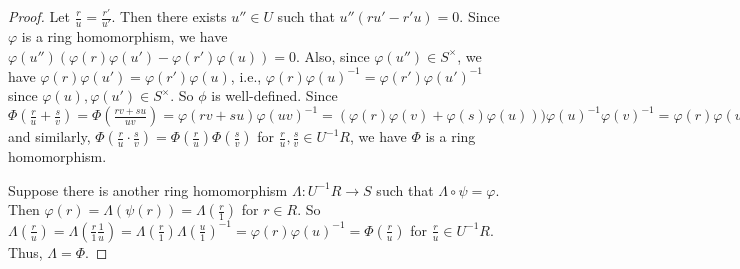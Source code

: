 \begin{proof}
    Let $\frac{r}{u} = \frac{r'}{u'}$. Then there exists $u'' \in U$ such that $u''(ru'-r'u) = 0$. Since $\varphi$ is a ring homomorphism, we have $\varphi(u'')(\varphi(r)\varphi(u') - \varphi(r')\varphi(u)) = 0$. Also, since $\varphi(u'') \in S^{\times}$, we have $\varphi(r)\varphi(u') = \varphi(r')\varphi(u)$, i.e., $\varphi(r)\varphi(u)^{-1} = \varphi(r')\varphi(u')^{-1}$ since $\varphi(u), \varphi(u') \in S^{\times}$. So $\phi$ is well-defined. Since $\Phi(\frac{r}{u} + \frac{s}{v}) = \Phi(\frac{rv+su}{uv}) = \varphi(rv+su)\varphi(uv)^{-1} = (\varphi(r)\varphi(v) + \varphi(s)\varphi(u))) \varphi(u)^{-1}\varphi(v)^{-1} = \varphi(r)\varphi(u)^{-1} + \varphi(s)\varphi(v)^{-1} = \Phi(\frac{r}{u}) + \Phi(\frac{s}{v})$ and similarly, $\Phi(\frac{r}{u} \cdot \frac{s}{v}) = \Phi(\frac{r}{u})\Phi(\frac{s}{v})$ for $\frac{r}{u},\frac{s}{v} \in U^{-1}R$, we have $\Phi$ is a ring homomorphism. \par 
    Suppose there is another ring homomorphism $\Lambda: U^{-1}R \to S$ such that $\Lambda \circ \psi = \varphi$.
    Then $\varphi(r) = \Lambda (\psi(r)) = \Lambda (\frac{r}{1})$ for $r \in R$. So $\Lambda(\frac{r}{u}) = \Lambda(\frac{r}{1} \frac{1}{u}) = \Lambda(\frac{r}{1}) \Lambda(\frac{u}{1})^{-1} = \varphi(r) \varphi(u)^{-1} = \Phi(\frac{r}{u})$ for $\frac{r}{u} \in U^{-1}R$. Thus, $\Lambda = \Phi$. 
\end{proof}

